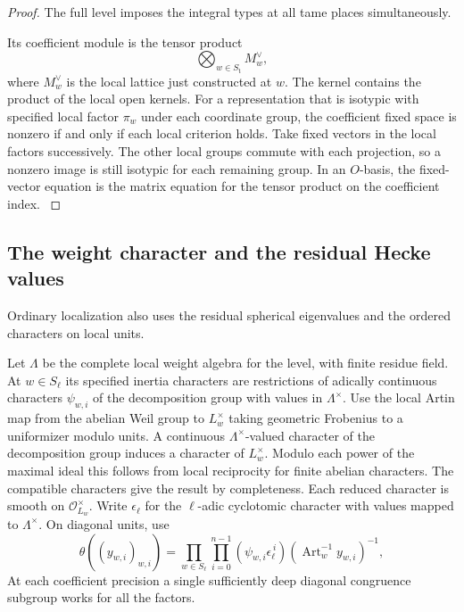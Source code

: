\begin{proof}
The full level imposes the integral types at all tame places simultaneously.

Its coefficient module is the tensor product
\[ \bigotimes_{w\in S_{\mathrm t}} M_w^\vee ,\]
where \(M_w^\vee\) is the local lattice just constructed at \(w\). The kernel contains the product of
the local open kernels. For a representation that is isotypic
with specified local factor \(\pi_w\) under each coordinate
group, the coefficient fixed space is nonzero if and only if
each local criterion holds. Take fixed vectors in the local
factors successively. The other local groups commute with each
projection, so a nonzero image is still isotypic for each
remaining group. In an \(O\)-basis, the fixed-vector equation
is the matrix equation for the tensor product on the coefficient
index.
\label{cor:ordinary-level-data-1}

\end{proof}

\subsection{The weight character and the residual Hecke values}

Ordinary localization also uses the residual spherical eigenvalues and the ordered characters on local units.

Let \(\Lambda\) be the complete local weight algebra for the level,
with finite residue field. At \(w\in S_\ell\) its specified inertia
characters are restrictions of adically continuous characters
\(\psi_{w,i}\) of the decomposition group with values in
\(\Lambda^\times\). Use the local Artin map from the abelian
Weil group to \(L_w^\times\) taking geometric Frobenius to a
uniformizer modulo units. A continuous \(\Lambda^\times\)-valued
character of the decomposition group induces a character of
\(L_w^\times\). Modulo each power of the maximal ideal this
follows from local reciprocity for finite abelian characters.
The compatible characters give the result by completeness.
Each reduced character is smooth on \(\mathcal O_{L_w}^\times\).
Write \(\epsilon_\ell\) for the \(\ell\)-adic cyclotomic character
with values mapped to \(\Lambda^\times\). On diagonal units, use
\[
   \theta((y_{w,i})_{w,i})
   =\prod_{w\in S_\ell}\prod_{i=0}^{n-1}
          (\psi_{w,i}\epsilon_\ell^{\,i})
                  (\operatorname{Art}_w^{-1} y_{w,i})^{-1},
\]
At each coefficient precision a single sufficiently deep
diagonal congruence subgroup works for all the factors.

